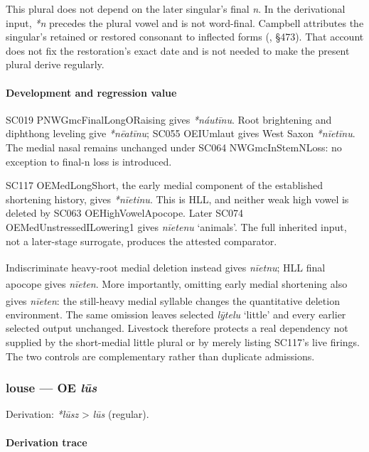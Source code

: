 \documentclass[
  british,
  a4paper,
]{article}
\providecommand{\Pred}[1]{\textsuperscript{\dag}\emph{#1}}
\begin{document}
This plural does not depend on the later singular's final \emph{n}. In
the derivational input, \emph{*n} precedes the plural vowel and is not
word-final. Campbell attributes the singular's retained or restored
consonant to inflected forms (, §473). That account does not fix the restoration's exact date and
is not needed to make the present plural derive regularly.

\paragraph{Development and regression
value}\label{development-and-regression-value}

SC019 PNWGmcFinalLongORaising gives \emph{*náutīnu}. Root brightening
and diphthong leveling give \emph{*nēatīnu}; SC055 OEIUmlaut gives West
Saxon \emph{*nīetīnu}. The medial nasal remains unchanged under SC064
NWGmcInStemNLoss: no exception to final-n loss is introduced.

SC117 OEMedLongShort, the early medial component of the established
shortening history, gives \emph{*nīetinu}. This is HLL, and neither weak
high vowel is deleted by SC063 OEHighVowelApocope. Later SC074
OEMedUnstressedILowering1 gives \emph{nīetenu} `animals'. The full
inherited input, not a later-stage surrogate, produces the attested
comparator.

Indiscriminate heavy-root medial deletion instead gives \Pred{nīetnu};
HLL final apocope gives \Pred{nīeten}. More importantly, omitting early
medial shortening also gives \Pred{nīeten}: the still-heavy medial
syllable changes the quantitative deletion environment. The same
omission leaves selected \emph{lȳtelu} `little' and every earlier
selected output unchanged. Livestock therefore protects a real
dependency not supplied by the short-medial little plural or by merely
listing SC117's live firings. The two controls are complementary rather
than duplicate admissions.

\subsubsection{\texorpdfstring{louse --- OE
\emph{lūs}}{louse --- OE lūs}}\label{louse-oe-lux16bs}

Derivation: \emph{*lūsz} \textgreater{} \emph{lūs} (regular).

\paragraph{Derivation trace}\label{derivation-trace-58}
\end{document}
